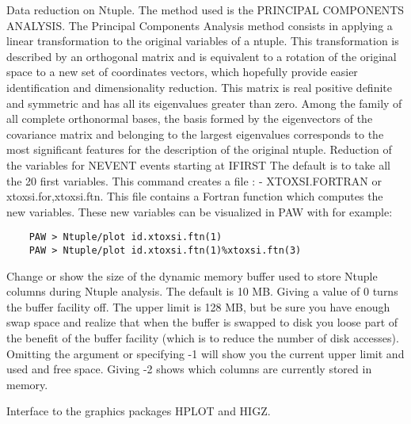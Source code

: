    \par
Data reduction on Ntuple.  The method used is the PRINCIPAL COMPONENTS 
   ANALYSIS.  The Principal Components Analysis method consists in applying a 
   linear transformation to the original variables of a ntuple.  This 
   transformation is described by an orthogonal matrix and is equivalent to a 
   rotation of the original space to a new set of coordinates vectors, which 
   hopefully provide easier identification and dimensionality reduction. This 
   matrix is real positive definite and symmetric and has all its eigenvalues 
   greater than zero.  Among the family of all complete orthonormal bases, the 
   basis formed by the eigenvectors of the covariance matrix and belonging to 
   the largest eigenvalues corresponds to the most significant features for 
   the description of the original ntuple.  Reduction of the variables for 
   NEVENT events starting at IFIRST The default is to take all the 20 first 
   variables.  This command creates a file : -\KET{} XTOXSI.FORTRAN or 
   xtoxsi.for,xtoxsi.ftn.  This file contains a Fortran function which 
   computes the new variables.  These new variables can be visualized in PAW 
   with for example:  
\begin{verbatim}
    PAW > Ntuple/plot id.xtoxsi.ftn(1)
    PAW > Ntuple/plot id.xtoxsi.ftn(1)%xtoxsi.ftn(3)
\end{verbatim}

\ENDCMD


\BEGARG
{}
\ENDARG

   \par
Change or show the size of the dynamic memory buffer used to store Ntuple 
   columns during Ntuple analysis. The default is 10 MB. Giving a value of 0 
   turns the buffer facility off. The upper limit is 128 MB, but be sure you 
   have enough swap space and realize that when the buffer is swapped to disk 
   you loose part of the benefit of the buffer facility (which is to reduce 
   the number of disk accesses). Omitting the argument or specifying -1 will 
   show you the current upper limit and used and free space. Giving -2 shows 
   which columns are currently stored in memory.  

\ENDCMD
{}
\ifMENUtext
   \par
Interface to the graphics packages HPLOT and HIGZ.  


